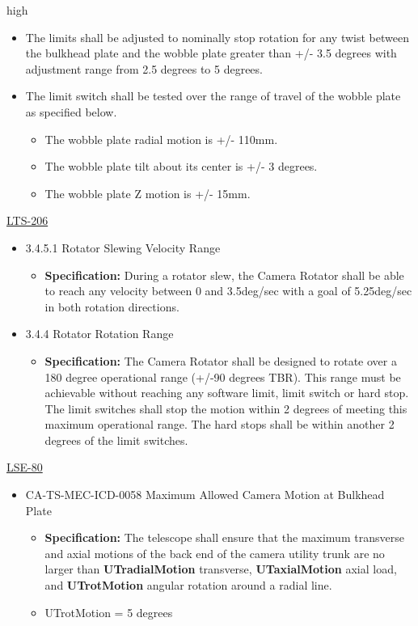 high\documentclass[SE,lsstdraft,authoryear,toc]{lsstdoc}
\begin{document}
\begin{itemize}
\item
  The limits shall be adjusted to nominally stop rotation for any twist
  between the bulkhead plate and the wobble plate greater than +/- 3.5
  degrees with adjustment range from 2.5 degrees to 5 degrees.
\item
  The limit switch shall be tested over the range of travel of the
  wobble plate as specified below.

  \begin{itemize}
  \item
    The wobble plate radial motion is +/- 110mm.
  \item
    The wobble plate tilt about its center is +/- 3 degrees.
  \item
    The wobble plate Z motion is +/- 15mm.
  \end{itemize}
\end{itemize}

\underline{LTS-206}

\begin{itemize}
\item
  3.4.5.1 Rotator Slewing Velocity Range

  \begin{itemize}
  \item
    \textbf{Specification:} During a rotator slew, the Camera Rotator
    shall be able to reach any velocity between 0 and 3.5deg/sec with a
    goal of 5.25deg/sec in both rotation directions.
  \end{itemize}
\item
  3.4.4 Rotator Rotation Range

  \begin{itemize}
  \item
    \textbf{Specification:} The Camera Rotator shall be designed to
    rotate over a 180 degree operational range (+/-90 degrees TBR). This
    range must be achievable without reaching any software limit, limit
    switch or hard stop. The limit switches shall stop the motion within
    2 degrees of meeting this maximum operational range. The hard stops
    shall be within another 2 degrees of the limit switches.
  \end{itemize}
\end{itemize}

\underline{LSE-80}

\begin{itemize}
\item
  CA-TS-MEC-ICD-0058 Maximum Allowed Camera Motion at Bulkhead Plate

  \begin{itemize}
  \item
    \textbf{Specification:} The telescope shall ensure that the maximum
    transverse and axial motions of the back end of the camera utility
    trunk are no larger than \textbf{UTradialMotion} transverse,
    \textbf{UTaxialMotion} axial load, and \textbf{UTrotMotion} angular
    rotation around a radial line.
  \item
    UTrotMotion = 5 degrees
  \end{itemize}
\end{itemize}
\end{document}
